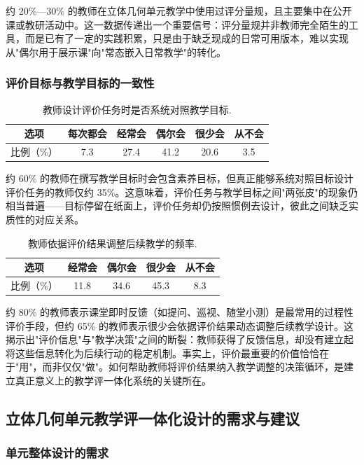 \documentclass[UTF8,a4paper,12pt,twoside]{ctexart}
\begin{document}
约 20\%—30\% 的教师在立体几何单元教学中使用过评分量规，且主要集中在公开课或教研活动中。这一数据传递出一个重要信号：评分量规并非教师完全陌生的工具，而是已有了一定的实践积累，只是由于缺乏现成的日常可用版本，难以实现从"偶尔用于展示课"向"常态嵌入日常教学"的转化。

\subsubsection{评价目标与教学目标的一致性}

\renewcommand\arraystretch{1.5}
\begin{longtable}{|c|c|c|c|c|c|}
\caption{\label{tab3.17}教师设计评价任务时是否系统对照教学目标.} \\
\hline
选项 & 每次都会 & 经常会 & 偶尔会 & 很少会 & 从不会 \\
\hline
比例（\%） & 7.3 & 27.4 & 41.2 & 20.6 & 3.5 \\
\hline
\end{longtable}

约 60\% 的教师在撰写教学目标时会包含素养目标，但真正能够系统对照目标设计评价任务的教师仅约 35\%。这意味着，评价任务与教学目标之间"两张皮"的现象仍相当普遍——目标停留在纸面上，评价任务却仍按照惯例去设计，彼此之间缺乏实质性的对应关系。

\renewcommand\arraystretch{1.5}
\begin{longtable}{|c|c|c|c|c|}
\caption{\label{tab3.18}教师依据评价结果调整后续教学的频率.} \\
\hline
选项 & 经常会 & 偶尔会 & 很少会 & 从不会 \\
\hline
比例（\%） & 11.8 & 34.6 & 45.3 & 8.3 \\
\hline
\end{longtable}

约 80\% 的教师表示课堂即时反馈（如提问、巡视、随堂小测）是最常用的过程性评价手段，但约 65\% 的教师表示很少会依据评价结果动态调整后续教学设计。这揭示出"评价信息"与"教学决策"之间的断裂：教师获得了反馈信息，却没有建立起将这些信息转化为后续行动的稳定机制。事实上，评价最重要的价值恰恰在于"用"，而非仅仅"做"。如何帮助教师将评价结果纳入教学调整的决策循环，是建立真正意义上的教学评一体化系统的关键所在。

\subsection{立体几何单元教学评一体化设计的需求与建议}

\subsubsection{单元整体设计的需求}
\end{document}
